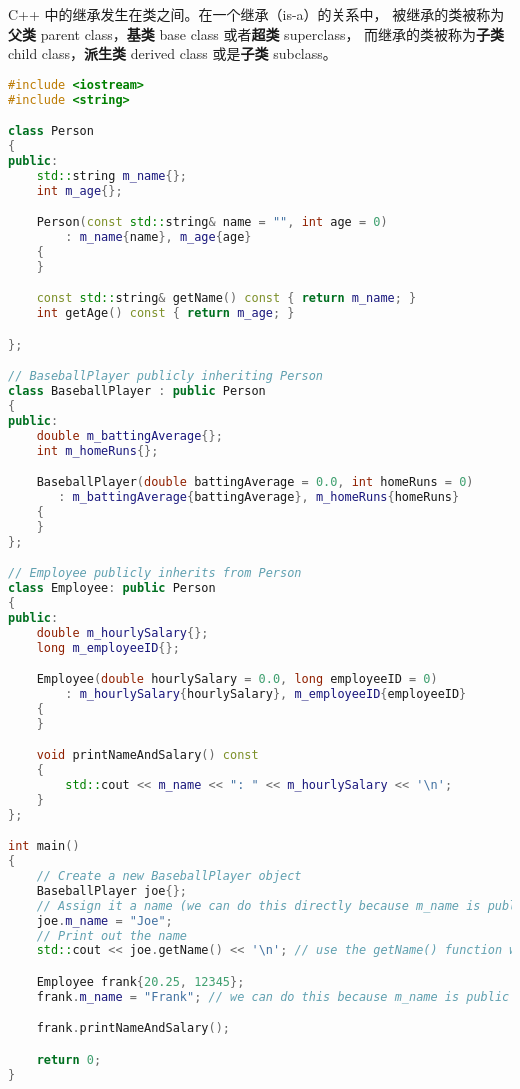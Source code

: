\documentclass[../../LearnCpp.tex]{subfiles}
\begin{document}

C++ 中的继承发生在类之间。在一个继承（is-a）的关系中，
被继承的类被称为\textbf{父类} parent class，\textbf{基类} base class 或者\textbf{超类} superclass，
而继承的类被称为\textbf{子类} child class，\textbf{派生类} derived class 或是\textbf{子类} subclass。

\begin{lstlisting}[language=C++]
#include <iostream>
#include <string>

class Person
{
public:
    std::string m_name{};
    int m_age{};

    Person(const std::string& name = "", int age = 0)
        : m_name{name}, m_age{age}
    {
    }

    const std::string& getName() const { return m_name; }
    int getAge() const { return m_age; }

};

// BaseballPlayer publicly inheriting Person
class BaseballPlayer : public Person
{
public:
    double m_battingAverage{};
    int m_homeRuns{};

    BaseballPlayer(double battingAverage = 0.0, int homeRuns = 0)
       : m_battingAverage{battingAverage}, m_homeRuns{homeRuns}
    {
    }
};

// Employee publicly inherits from Person
class Employee: public Person
{
public:
    double m_hourlySalary{};
    long m_employeeID{};

    Employee(double hourlySalary = 0.0, long employeeID = 0)
        : m_hourlySalary{hourlySalary}, m_employeeID{employeeID}
    {
    }

    void printNameAndSalary() const
    {
        std::cout << m_name << ": " << m_hourlySalary << '\n';
    }
};

int main()
{
    // Create a new BaseballPlayer object
    BaseballPlayer joe{};
    // Assign it a name (we can do this directly because m_name is public)
    joe.m_name = "Joe";
    // Print out the name
    std::cout << joe.getName() << '\n'; // use the getName() function we've acquired from the Person base class

    Employee frank{20.25, 12345};
    frank.m_name = "Frank"; // we can do this because m_name is public

    frank.printNameAndSalary();

    return 0;
}
\end{lstlisting}
\end{document}
